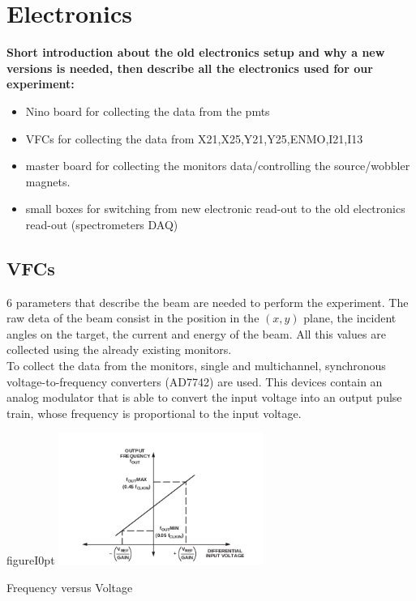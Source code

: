 \section{Electronics}
{\bfseries Short introduction about the old electronics setup and why a new versions is needed, then describe all the electronics used for our experiment:}
\begin{itemize}
\item Nino board for collecting the data from the pmts
\item VFCs for collecting the data from X21,X25,Y21,Y25,ENMO,I21,I13
\item master board for collecting the monitors data/controlling the source/wobbler magnets.
\item small boxes for switching from new electronic read-out to the old electronics read-out (spectrometers DAQ)
\end{itemize}

\subsection{VFCs}

6 parameters that describe the beam are needed to perform the experiment. The raw deta of the beam consist in the position in the $(x,y)$ plane, the incident angles on the target, the current and energy of the beam. All this values are collected using the already existing monitors. \\
To collect the data from the monitors, single and multichannel, synchronous voltage-to-frequency converters (AD7742) are used. This devices contain an analog modulator that is able to convert the input voltage into an output pulse train, whose frequency is proportional to the input voltage. 

\begin{wrapfloat}{figure}{I}{0pt}
\includegraphics[width=0.5\textwidth]{ExperimentalSetup/Vfc.png}
\caption{Frequency versus Voltage}
\end{wrapfloat}

